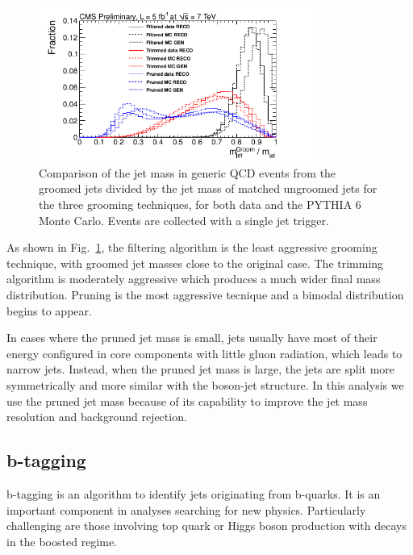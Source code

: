 \begin{figure}[hbtp]
  \begin{center}
    \includegraphics[width=0.8\textwidth]{figure/CH3/JetGrooming.png}
  \end{center}
  \caption{\label{fig:JetGrooming}Comparison of the jet mass in generic QCD events from the groomed jets divided by the jet mass of matched ungroomed jets for the three grooming techniques, for both data and the PYTHIA 6 Monte Carlo.\cite{SMP-12-019} Events are collected with a single jet trigger.}
\end{figure}

As shown in Fig.~\ref{fig:JetGrooming}, the filtering algorithm is the least aggressive grooming technique, with groomed jet masses close to the original case. The trimming algorithm is moderately aggressive which produces a much wider final mass distribution. Pruning is the most aggressive tecnique and a bimodal distribution begins to appear.

In cases where the pruned jet mass is small, jets usually have most of their energy configured in core components with little gluon radiation, which leads to narrow jets. Instead, when the pruned jet mass is large, the jets are split more symmetrically and more similar with the boson-jet structure. In this analysis we use the pruned jet mass because of its capability to improve the jet mass resolution and background rejection.

\subsection{b-tagging}

b-tagging\cite{btagAlgo,BTV-13-001} is an algorithm to identify jets originating from b-quarks. It is an important component in analyses searching for new physics. Particularly challenging are those involving top quark or Higgs boson production with decays in the boosted regime.

